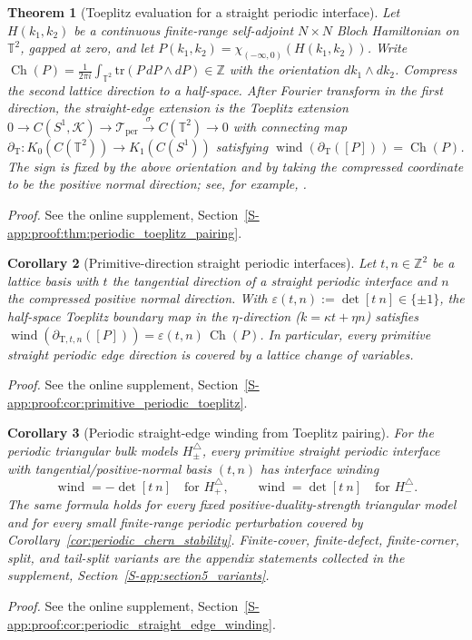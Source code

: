 \documentclass[11pt]{article}
\numberwithin{equation}{section}
\newtheorem{theorem}{Theorem}[section]
\newtheorem{corollary}[theorem]{Corollary}
\theoremstyle{definition}
\theoremstyle{remark}
\newcommand{\proofsuppref}[1]{%
  \par\noindent\emph{Proof.} See the online supplement, Section~\ref{S-#1}.\par\medskip
}
\newcommand{\tr}{\mathrm{tr}}
\newcommand{\Ch}{\operatorname{Ch}}
\begin{document}
\begin{theorem}[Toeplitz evaluation for a straight periodic interface]\label{thm:periodic_toeplitz_pairing}
Let \(H(k_1,k_2)\) be a continuous finite-range self-adjoint \(N\times N\) Bloch Hamiltonian on
\(\mathbb T^2\), gapped at zero, and let
\(P(k_1,k_2)=\chi_{(-\infty,0)}(H(k_1,k_2))\). Write
\(\Ch(P)=\frac{1}{2\pi i}\int_{\mathbb T^2}\tr(P\,dP\wedge dP)\in\mathbb Z\) with the
orientation \(dk_1\wedge dk_2\). Compress the second lattice direction to a half-space. After
Fourier transform in the first direction, the straight-edge extension is the Toeplitz extension
\(0\to C(S^1,\mathcal K)\to\mathcal T_{\mathrm{per}}\xrightarrow{\sigma}C(\mathbb T^2)\to 0\) with
connecting map \(\partial_{\mathrm T}:K_0(C(\mathbb T^2))\to K_1(C(S^1))\) satisfying
\(\operatorname{wind}(\partial_{\mathrm T}([P]))=\Ch(P)\). The sign is fixed by the above
orientation and by taking the compressed coordinate to be the positive normal direction; see, for
example, \cite{BDF1977,BlackadarKTheory,ProdanSchulzBaldesBook,BourneKellendonkRennie}.
\end{theorem}
\proofsuppref{app:proof:thm:periodic_toeplitz_pairing}

\begin{corollary}[Primitive-direction straight periodic interfaces]\label{cor:primitive_periodic_toeplitz}
Let \(t,n\in\mathbb Z^2\) be a lattice basis with \(t\) the tangential direction of a straight
periodic interface and \(n\) the compressed positive normal direction. With
\(\varepsilon(t,n):=\det[t\ n]\in\{\pm1\}\), the half-space Toeplitz boundary map in the
\(\eta\)-direction (\(k=\kappa t+\eta n\)) satisfies
\(\operatorname{wind}\!\left(\partial_{\mathrm T,t,n}([P])\right)=\varepsilon(t,n)\,\Ch(P)\). In
particular, every primitive straight periodic edge direction is covered by a lattice change of
variables.
\end{corollary}
\proofsuppref{app:proof:cor:primitive_periodic_toeplitz}

\begin{corollary}[Periodic straight-edge winding from Toeplitz pairing]\label{cor:periodic_straight_edge_winding}
For the periodic triangular bulk models \(H^\triangle_\pm\), every primitive straight periodic
interface with tangential/positive-normal basis \((t,n)\) has interface winding
\[
\operatorname{wind}=-\det[t\ n]\quad\text{for }H^\triangle_+,
\qquad
\operatorname{wind}=\det[t\ n]\quad\text{for }H^\triangle_-.
\]
The same formula holds for every fixed positive-duality-strength triangular model and for every
small finite-range periodic perturbation covered by
Corollary~\ref{cor:periodic_chern_stability}. Finite-cover, finite-defect, finite-corner, split,
and tail-split variants are the appendix statements collected in the supplement,
Section~\ref{S-app:section5_variants}.
\end{corollary}
\proofsuppref{app:proof:cor:periodic_straight_edge_winding}
\end{document}
